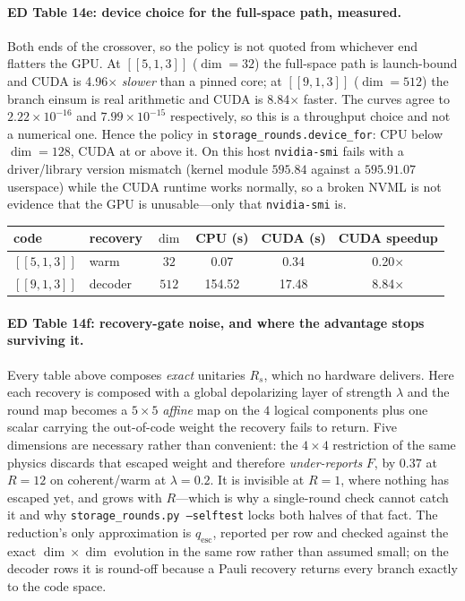 \documentclass[10pt,a4paper]{article}
\begin{document}
\paragraph*{ED Table 14e: device choice for the full-space path, measured.}
Both ends of the crossover, so the policy is not quoted from whichever end
flatters the GPU.  At $[\![5,1,3]\!]$ ($\dim=32$) the full-space path is
launch-bound and CUDA is 4.96$\times$ \emph{slower} than a pinned core; at
$[\![9,1,3]\!]$ ($\dim=512$) the branch einsum is real arithmetic and CUDA is
8.84$\times$ faster.  The curves agree to $2.22\times 10^{-16}$ and $7.99\times 10^{-15}$ respectively, so this is a
throughput choice and not a numerical one.  Hence the policy in
\texttt{storage\_rounds.device\_for}: CPU below $\dim=128$, CUDA at or above it.
On this host \texttt{nvidia-smi} fails with a driver/library version mismatch
(kernel module $595.84$ against a $595.91.07$ userspace) while the CUDA runtime
works normally, so a broken NVML is not evidence that the GPU is unusable---only
that \texttt{nvidia-smi} is.
\begin{longtable}{llcccc}
\toprule code & recovery & $\dim$ & CPU (s) & CUDA (s) & CUDA speedup \\ \midrule
$[\![5,1,3]\!]$ & warm & $32$ & 0.07 & 0.34 & 0.20$\times$ \\
$[\![9,1,3]\!]$ & decoder & $512$ & 154.52 & 17.48 & 8.84$\times$ \\
\bottomrule\end{longtable}

\paragraph*{ED Table 14f: recovery-gate noise, and where the advantage stops surviving it.}
Every table above composes \emph{exact} unitaries $R_s$, which no hardware
delivers.  Here each recovery is composed with a global depolarizing layer of
strength $\lambda$ and the round map becomes a $5\times5$ \emph{affine} map on the
$4$ logical components plus one scalar carrying the out-of-code weight the
recovery fails to return.  Five dimensions are necessary rather than convenient:
the $4\times4$ restriction of the same physics discards that escaped weight and
therefore \emph{under-reports} $F$, by $0.37$ at $R=12$ on coherent/warm at
$\lambda=0.2$.  It is invisible at $R=1$, where nothing has escaped yet, and grows
with $R$---which is why a single-round check cannot catch it and why
\texttt{storage\_rounds.py --selftest} locks both halves of that fact.  The
reduction's only approximation is $q_\mathrm{esc}$, reported per row and checked
against the exact $\dim\times\dim$ evolution in the same row rather than assumed
small; on the decoder rows it is round-off because a Pauli recovery returns every
branch exactly to the code space.
\end{document}
